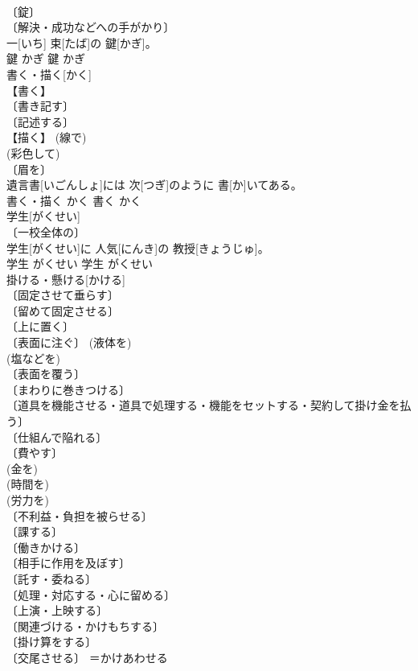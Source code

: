 \documentclass[8pt]{extreport}
\begin{document}
\begin{CJK}{UTF8}{min}
\\	〔錠〕 
\\	〔解決・成功などへの手がかり〕 
\\	一[いち] 束[たば]の 鍵[かぎ]。	
\\	鍵	かぎ	鍵	かぎ	
\\	書く・描く[かく]	
\\	【書く】 
\\	〔書き記す〕 
\\	〔記述する〕 
\\	【描く】 (線で) 
\\	(彩色して) 
\\	〔眉を〕 
\\	遺言書[いごんしょ]には 次[つぎ]のように 書[か]いてある。	
\\	書く・描く	かく	書く	かく	
\\	学生[がくせい]	
\\	〔一校全体の〕 
\\	学生[がくせい]に 人気[にんき]の 教授[きょうじゅ]。	
\\	学生	がくせい	学生	がくせい	
\\	掛ける・懸ける[かける]	
\\	〔固定させて垂らす〕 
\\	〔留めて固定させる〕 
\\	〔上に置く〕 
\\	〔表面に注ぐ〕 (液体を) 
\\	(塩などを) 
\\	〔表面を覆う〕 
\\	〔まわりに巻きつける〕 
\\	〔道具を機能させる・道具で処理する・機能をセットする・契約して掛け金を払う〕 
\\	〔仕組んで陥れる〕 
\\	〔費やす〕 
\\	(金を) 
\\	(時間を) 
\\	(労力を) 
\\	〔不利益・負担を被らせる〕 
\\	〔課する〕 
\\	〔働きかける〕 
\\	〔相手に作用を及ぼす〕 
\\	〔託す・委ねる〕 
\\	〔処理・対応する・心に留める〕 
\\	〔上演・上映する〕 
\\	〔関連づける・かけもちする〕 
\\	〔掛け算をする〕 
\\	〔交尾させる〕 ＝かけあわせる 

\end{CJK}
\end{document}
